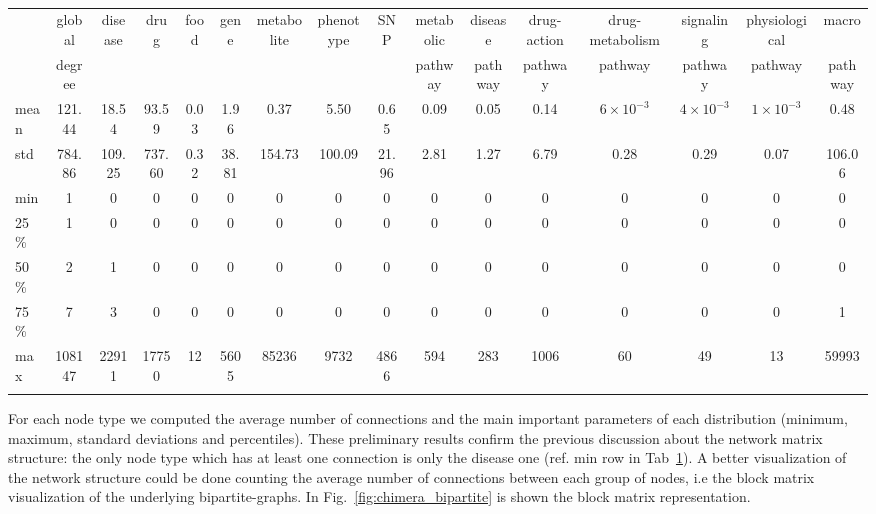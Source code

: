 \documentclass{standalone}
\begin{document}
\begin{table}
\centering
\begin{tabular}{lccccccccccccccc}
\hline \rowcolor{darkgrayrow}
       & global  & disease &   drug & food & gene & metabolite & phenotype &  SNP & metabolic & disease   & drug-action & drug-metabolism &  signaling       & physiological   & macro   \\
\rowcolor{darkgrayrow}
       & degree  &         &        &      &      &            &           &      & pathway   & pathway   & pathway     &  pathway        &  pathway         &  pathway        & pathway \\
mean   &  121.44 &   18.54 &  93.59 & 0.03 & 1.96 &       0.37 &      5.50 & 0.65 &      0.09 &      0.05 &        0.14 & $6\times10^{-3}$& $4\times10^{-3}$ &$1\times10^{-3}$ &   0.48  \\
std    &  784.86 &  109.25 & 737.60 & 0.32 &38.81 &     154.73 &    100.09 &21.96 &      2.81 &      1.27 &        6.79 &            0.28 &             0.29 &            0.07 & 106.06  \\
min    &       1 &       0 &      0 &    0 &    0 &          0 &         0 &    0 &         0 &         0 &           0 &               0 &                0 &               0 &      0  \\
25\%   &       1 &       0 &      0 &    0 &    0 &          0 &         0 &    0 &         0 &         0 &           0 &               0 &                0 &               0 &      0  \\
50\%   &       2 &       1 &      0 &    0 &    0 &          0 &         0 &    0 &         0 &         0 &           0 &               0 &                0 &               0 &      0  \\
75\%   &       7 &       3 &      0 &    0 &    0 &          0 &         0 &    0 &         0 &         0 &           0 &               0 &                0 &               0 &      1  \\
max    &  108147 &   22911 &  17750 &   12 & 5605 &      85236 &      9732 & 4866 &       594 &       283 &        1006 &              60 &               49 &              13 &  59993  \\
\hline\\
\end{tabular}
\caption{
}
\label{tab:chimera_degree}
\end{table}

For each node type we computed the average number of connections and the main important parameters of each distribution (minimum, maximum, standard deviations and percentiles).
These preliminary results confirm the previous discussion about the network matrix structure: the only node type which has at least one connection is only the disease one (ref. min row in Tab~\ref{tab:chimera_degree}).
A better visualization of the network structure could be done counting the average number of connections between each group of nodes, i.e the block matrix visualization of the underlying bipartite-graphs.
In Fig.~\ref{fig:chimera_bipartite} is shown the block matrix representation.
\end{document}
